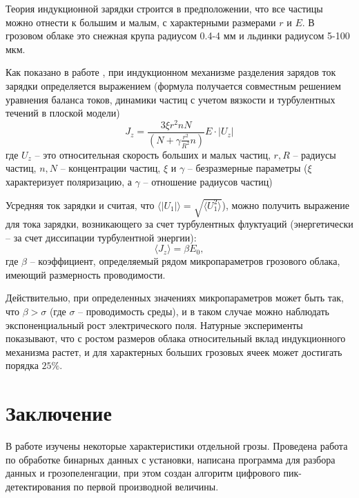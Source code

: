 \documentclass[a4paper,14pt]{extarticle}
\newcommand{\mean}[1]{\langle#1\rangle}
\begin{document}
Теория индукционной зарядки строится в предположении, что все частицы можно отнести к большим и малым, с характерными размерами $r$ и $E$. В грозовом облаке это  снежная крупа радиусом 0.4-4 мм и льдинки радиусом 5-100 мкм.%
 
Как показано в работе \cite{dem}, при индукционном механизме разделения зарядов ток зарядки определяется выражением (формула получается совместным решением уравнения баланса токов, динамики частиц с учетом вязкости и турбулентных течений в плоской модели)
\begin{equation}
  J_{z}=\frac{3 \xi r^{2} n N}{\left(N+\gamma \frac{r^{2}}{R^{2}} n\right)} E \cdot\left|U_{z}\right|
\end{equation}
где $U_z$ -- это относительная скорость больших и малых частиц, $r,R$ -- радиусы частиц, $n,N$ -- концентрации частиц, $\xi$ и $\gamma$ -- безразмерные параметры ($\xi$ характеризует поляризацию, а $\gamma$ -- отношение радиусов частиц)


Усредняя ток зарядки и считая, что $\mean{|U_1|}=\sqrt{\mean{U_1^2}}$), можно получить выражение для тока зарядки, возникающего за счет турбулентных флуктуаций (энергетически -- за счет диссипации турбулентной энергии):
\begin{equation}
  \mean{J_z} = \beta E_0,
\end{equation}
где $\beta$ -- коэффициент, определяемый рядом микропараметров грозового облака, имеющий размерность проводимости.

Действительно, при определенных значениях микропараметров может быть так, что $\beta>\sigma$ (где $\sigma$ -- проводимость среды), и в таком случае можно наблюдать экспоненциальный рост электрического поля. Натурные эксперименты показывают, что 
с ростом размеров облака относительный вклад индукционного механизма растет, и для характерных больших грозовых ячеек может достигать порядка $25\%$.


\newpage
\section*{Заключение}

В работе изучены некоторые характеристики отдельной грозы. Проведена работа по обработке бинарных данных с установки, написана программа для разбора данных и грозопеленгации, при этом создан алгоритм цифрового пик-детектирования по первой производной величины. 

\vspace{-1em}
\end{document}
